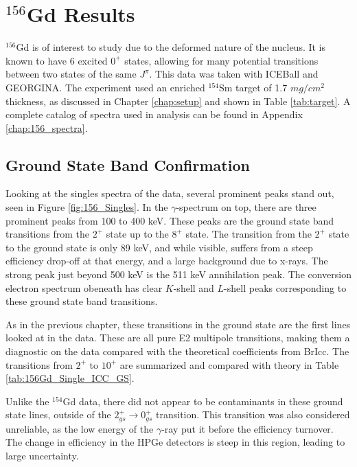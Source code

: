 \chapter{$^{156}$Gd Results}
\normalsize

$^{156}$Gd is of interest to study due to the deformed nature of the nucleus. It is known to have 6 excited $0^+$ states, allowing for many potential transitions between two states of the same $J^\pi$. This data was taken with ICEBall and GEORGINA. The experiment used an enriched $^{154}$Sm target of 1.7 $mg/cm^2$ thickness, as discussed in Chapter \ref{chap:setup} and shown in Table \ref{tab:target}. A complete catalog of spectra used in analysis can be found in Appendix \ref{chap:156_spectra}.

\section{Ground State Band Confirmation}

Looking at the singles spectra of the data, several prominent peaks stand out, seen in Figure \ref{fig:156_Singles}. In the $\gamma$-spectrum on top, there are three prominent peaks from 100 to 400 keV. These peaks are the ground state band transitions from the $2^+$ state up to the $8^+$ state. The transition from the $2^+$ state to the ground state is only 89 keV, and while visible, suffers from a steep efficiency drop-off at that energy, and a large background due to x-rays. The strong peak just beyond 500 keV is the 511 keV annihilation peak. The conversion electron spectrum obeneath has clear $K$-shell and $L$-shell peaks corresponding to these ground state band transitions. 



As in the previous chapter, these transitions in the ground state are the first lines looked at in the data. These are all pure E2 multipole transitions, making them a diagnostic on the data compared with the theoretical coefficients from BrIcc\citep{kibedi08:_BRICC}. The transitions from $2^+$ to $10^+$ are summarized and compared with theory in Table \ref{tab:156Gd_Single_ICC_GS}.



Unlike the $^{154}$Gd data, there did not appear to be contaminants in these ground state lines, outside of the $2_{gs}^+\rightarrow0_{gs}^+$ transition. This transition was also considered unreliable, as the low energy of the $\gamma$-ray put it before the efficiency turnover. The change in efficiency in the HPGe detectors is steep in this region, leading to large uncertainty.

